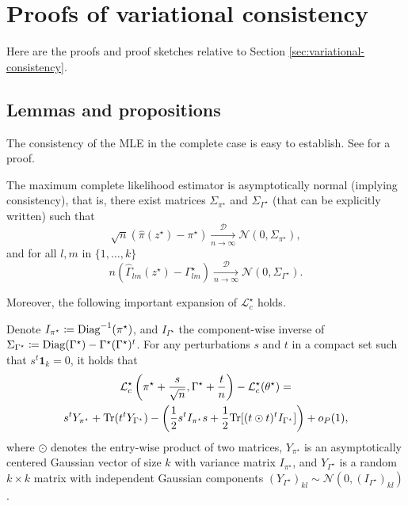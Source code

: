 \documentclass[../../main.tex]{subfiles} %
\begin{document}
\section{Proofs of variational consistency}
\label{sec:variational-consistency-proofs}
Here are the proofs and proof sketches relative to Section 
\ref{sec:variational-consistency}.

\subsection{Lemmas and propositions}
The consistency of the MLE in the complete case is easy to establish. See 
\cite{brault_consistency_2020} for a proof.
\begin{proposition}
	The maximum complete likelihood estimator is asymptotically 
	normal (implying consistency), that is, there exist matrices 
	\(\Sigma_{\pi^\star}\) and 
	\(\Sigma_{\Gamma^\star}\) (that can be explicitly written) such that
	\begin{equation}
		\sqrt{n} (\hat{\pi}(z^\star) - \pi^\star) \xrightarrow[n \to \infty]{\mathcal 
			D} \mathcal N (0, \Sigma_{\pi^\star}),
	\end{equation}
	and for all \(l, m\) in \(\{1, \dots, k\}\)
	\begin{equation}
		n (\hat{\Gamma}_{lm}(z^\star) - \Gamma^\star_{lm}) \xrightarrow[n \to 
		\infty]{\mathcal 
			D} \mathcal N (0, \Sigma_{\Gamma^\star}).
	\end{equation}
	\label{prop:consistency-complete-mle}
\end{proposition}

Moreover, the following important expansion of \(\mathcal L^\star_c\) holds.
\begin{proposition}
	Denote \(I_{\pi^\star} \coloneqq \textup{Diag}^{-1}(\pi^\star)\), and 
	\(I_{\Gamma^\star}\) the component-wise inverse of 
	\(\Sigma_{\Gamma^\star} \coloneqq \textup{Diag}(\Gamma^\star) - 
	\Gamma^\star (\Gamma^\star)^t\). For any perturbations \(s\) and \(t\) in a 
	compact set such that \(s^t \mathbf{1}_{k} = 0\), it holds that
	\begin{multline}
		\mathcal{L}^\star_c \left( \pi^\star + \frac{s}{\sqrt n}, \Gamma^\star + 
		\frac{t}{n}\right) - \mathcal L^\star_c (\theta^\star) = \\
		s^t Y_{\pi^\star} + \textup{Tr}(t^t 
		Y_{\Gamma^\star})
		- \left(\frac{1}{2} s^t I_{\pi^\star} s + \frac{1}{2} \textup{Tr}[(t \odot t)^t 
		I_{\Gamma^\star}]\right) + o_P (1),
		\label{eq:expansion}
	\end{multline}
	where \(\odot\) denotes the entry-wise product of two matrices, 
	\(Y_{\pi^\star}\) is an asymptotically centered Gaussian vector of size \(k\) 
	with variance matrix \(I_{\pi^\star}\), and \(Y_{\Gamma^\star}\) is a random 
	\(k \times k\) matrix with independent Gaussian components 
	\((Y_{\Gamma^\star})_{kl} \sim \mathcal N (0, (I_{\Gamma^\star})_{kl})\).
	\label{prop:LAN}
\end{proposition}
\end{document}
